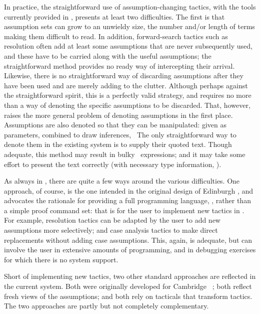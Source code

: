 {In practice, the straightforward use of assumption-changing
tactics,
with the tools currently provided in \HOL, presents at
least two difficulties.  The first is that assumption sets can grow to an
unwieldy size, the number and/or length of terms making them difficult to
read.  In addition, forward-search tactics such as resolution often add at least
some assumptions that are never subsequently used, and these have to be
carried along with the useful assumptions; the straightforward
method provides no ready way of intercepting their arrival.
Likewise, there is no straightforward way of discarding
assumptions after they have been used and are merely adding to the clutter.
Although perhaps against the straightforward spirit, this is a perfectly valid
strategy, and
requires no more than a way of denoting 
the specific assumptions to be discarded. That, however,
raises the more general problem of denoting assumptions in the first place.
Assumptions are also denoted
so that they can be
manipulated: given as parameters, combined to draw inferences, \etc\  The only
straightforward way to denote them in the existing system is to supply
their quoted text.  Though adequate, this 
method may result in bulky \ML\ expressions; and it may take some effort to present the text
correctly (with necessary type information, \etc).

As always in \HOL, there are quite a few ways around the various difficulties.
One approach, of course, is the one intended in the original 
design of Edinburgh \LCF,
and advocates the rationale for providing a full programming language, \ML,
rather than a simple proof command set: that is for the user to
implement new tactics in \ML.  For example, resolution tactics can be adapted
by the user to add new assumptions more selectively; and case analysis tactics
to make direct replacements without adding case assumptions.
This, again, is adequate, but can involve the user in extensive amounts of
programming, and in debugging exercises for which there is no
system support.

Short of implementing new tactics, two other standard
approaches are reflected in the current system.  Both were originally
developed for Cambridge \LCF\ \cite{lcp_rewrite,new-LCF-man}; both reflect
fresh views of the assumptions; and both rely on tacticals that transform
tactics.  The two approaches are 
partly but not completely complementary.  

}
